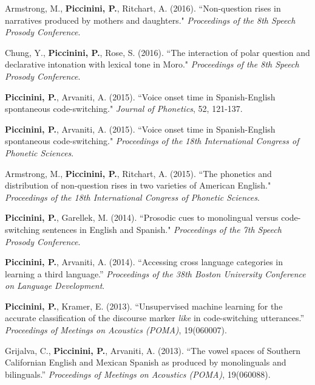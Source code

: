 \documentclass[9pt]{article}
\newenvironment{changemargin}[2]{%
  \begin{list}{}{%
    \setlength{\topsep}{0pt}%
    \setlength{\leftmargin}{#1}%
    \setlength{\rightmargin}{#2}%
    \setlength{\listparindent}{\parindent}%
    \setlength{\itemindent}{\parindent}%
    \setlength{\parsep}{\parskip}%
  }%
  \item[]}{\end{list}
}
\newenvironment{body} {
	\vspace*{-16pt}
	\begin{changemargin}{-0.25in}{-0.5in}
  }	
	{\end{changemargin}
}
\begin{document}
\begin{body}
	\vspace{14pt}
	
	Armstrong, M., \textbf{Piccinini, P.}, Ritchart, A. (2016). ``Non-question rises in narratives produced by mothers and daughters." \emph{Proceedings of the 8th Speech Prosody Conference}.\\
	\medskip
	
	Chung, Y., \textbf{Piccinini, P.}, Rose, S. (2016). ``The interaction of polar question and declarative intonation with lexical tone in Moro." \emph{Proceedings of the 8th Speech Prosody Conference}.\\
	\medskip

	\textbf{Piccinini, P.}, Arvaniti, A. (2015). ``Voice onset time in Spanish-English spontaneous code-switching." \emph{Journal of Phonetics}, 52, 121-137.\\
	\medskip

	\textbf{Piccinini, P.}, Arvaniti, A. (2015). ``Voice onset time in Spanish-English spontaneous code-switching." \emph{Proceedings of the 18th International Congress of Phonetic Sciences}.\\
	\medskip
	
	Armstrong, M., \textbf{Piccinini, P.}, Ritchart, A. (2015). ``The phonetics and distribution of non-question rises in two varieties of American English." \emph{Proceedings of the 18th International Congress of Phonetic Sciences}.\\
	\medskip
	
	\textbf{Piccinini, P.}, Garellek, M. (2014). ``Prosodic cues to monolingual versus code-switching sentences in English and Spanish." \emph{Proceedings of the 7th Speech Prosody Conference}.\\
	\medskip
	
	\textbf{Piccinini, P.}, Arvaniti, A. (2014). ``Accessing cross language categories in learning a third language.'' \emph{Proceedings of the 38th Boston University Conference on Language Development}.\\
	 \medskip

	\textbf{Piccinini, P.}, Kramer, E. (2013). ``Unsupervised machine learning for the accurate classification of the discourse marker \emph{like} in code-switching utterances.'' \emph{Proceedings of Meetings on Acoustics (POMA)}, 19(060007).\\
	 \medskip
	
	Grijalva, C., \textbf{Piccinini, P.}, Arvaniti, A. (2013). ``The vowel spaces of Southern Californian English and Mexican Spanish as produced by monolinguals and bilinguals.'' \emph{Proceedings of Meetings on Acoustics (POMA)}, 19(060088).\\
\end{body}
\end{document}
